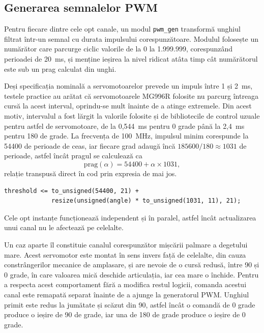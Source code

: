 \subsection{Generarea semnalelor PWM}

Pentru fiecare dintre cele opt canale, un modul \texttt{pwm\_gen} transformă unghiul
filtrat într-un semnal cu durata impulsului corespunzătoare. Modulul folosește un
numărător care parcurge ciclic valorile de la 0 la 1.999.999, corespunzând perioadei
de 20~ms, și menține ieșirea la nivel ridicat atâta timp cât numărătorul este sub un
prag calculat din unghi.

Deși specificația nominală a servomotoarelor prevede un impuls între 1 și 2~ms,
testele practice au arătat că servomotoarele MG996R folosite nu parcurg întreaga cursă
la acest interval, oprindu-se mult înainte de a atinge extremele. Din acest motiv,
intervalul a fost lărgit la valorile folosite și de bibliotecile de control uzuale
pentru astfel de servomotoare, de la 0,544~ms pentru 0 grade până la 2,4~ms pentru
180 de grade. La frecvența de 100~MHz, impulsul minim corespunde la 54400 de perioade
de ceas, iar fiecare grad adaugă încă $185600/180 \approx 1031$ de perioade, astfel
încât pragul se calculează ca
%
\begin{equation*}
\text{prag}(\alpha) = 54400 + \alpha \times 1031,
\end{equation*}
%
relație transpusă direct în cod prin expresia de mai jos.

\begin{lstlisting}[caption={Calculul pragului de comparație din unghi.},label={lst:pwm-thr}]
threshold <= to_unsigned(54400, 21) +
             resize(unsigned(angle) * to_unsigned(1031, 11), 21);
\end{lstlisting}

Cele opt instanțe funcționează independent și în paralel, astfel încât actualizarea
unui canal nu le afectează pe celelalte.

Un caz aparte îl constituie canalul corespunzător mișcării palmare a degetului mare.
Acest servomotor este montat în sens invers față de celelalte, din cauza
constrângerilor mecanice de amplasare, și are nevoie de o cursă redusă, între 90 și 0
grade, în care valoarea mică deschide articulația, iar cea mare o închide. Pentru a
respecta acest comportament fără a modifica restul logicii, comanda acestui canal este
remapată separat înainte de a ajunge la generatorul PWM. Unghiul primit este redus la
jumătate și scăzut din 90, astfel încât o comandă de 0 grade produce o ieșire de 90 de
grade, iar una de 180 de grade produce o ieșire de 0 grade.

